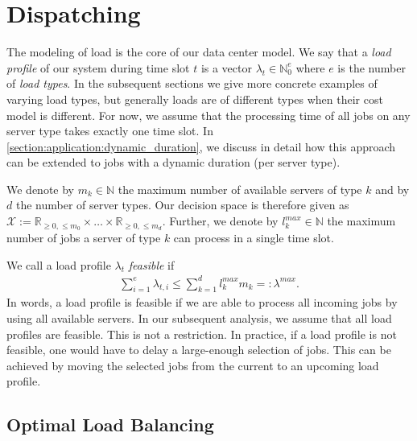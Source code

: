 \section{Dispatching}\label{section:application:dispatching}

The modeling of load is the core of our data center model. We say that a \textit{load profile} of our system during time slot $t$ is a vector $\lambda_t \in \mathbb{N}_0^e$ where $e$ is the number of \textit{load types}. In the subsequent sections we give more concrete examples of varying load types, but generally loads are of different types when their cost model is different. For now, we assume that the processing time of all jobs on any server type takes exactly one time slot. In \autoref{section:application:dynamic_duration}, we discuss in detail how this approach can be extended to jobs with a dynamic duration (per server type).

We denote by $m_k \in \mathbb{N}$ the maximum number of available servers of type $k$ and by $d$ the number of server types. Our decision space is therefore given as $\mathcal{X} := \mathbb{R}_{\geq 0, \leq m_0} \times \dots \times \mathbb{R}_{\geq 0, \leq m_d}$. Further, we denote by $l_k^{max} \in \mathbb{N}$ the maximum number of jobs a server of type $k$ can process in a single time slot.

We call a load profile $\lambda_t$ \textit{feasible} if \begin{align}
    \sum_{i=1}^e \lambda_{t,i} \leq \sum_{k=1}^d l_k^{max} m_k =: \lambda^{max}.
\label{eq:feasible_load_profiles}
\end{align} In words, a load profile is feasible if we are able to process all incoming jobs by using all available servers. In our subsequent analysis, we assume that all load profiles are feasible. This is not a restriction. In practice, if a load profile is not feasible, one would have to delay a large-enough selection of jobs. This can be achieved by moving the selected jobs from the current to an upcoming load profile.

\subsection{Optimal Load Balancing}\label{section:application:dispatching:optimal_load_balancing}

